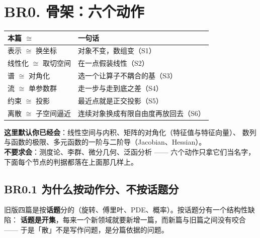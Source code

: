 
\section{BR0. 骨架：六个动作}
\label{sec:br0}

\begin{center}
\small
\begin{tabular}{L{2.4cm}L{11.4cm}}
\toprule
\textbf{本篇 $\cong$} & \textbf{一句话} \\
\midrule
表示 $\cong$ 换坐标 & 对象不变，数组变（S1）\\
线性化 $\cong$ 取切空间 & 在一点假装线性（S2）\\
谱 $\cong$ 对角化 & 选一个让算子不耦合的基（S3）\\
流 $\cong$ 单参数群 & 走一步与走到底之差（S4）\\
约束 $\cong$ 投影 & 最近点就是正交投影（S5）\\
离散 $\cong$ 子空间逼近 & 连续对象换成有限自由度再放回去（S6）\\
\bottomrule
\end{tabular}
\end{center}

\noindent\small\textbf{这里默认你已经会}：线性空间与内积、矩阵的对角化（特征值与特征向量）、
数列与函数的极限、多元函数的一阶与二阶导（Jacobian、Hessian）。\\
\textbf{不要求会}：测度论、李群、微分几何、泛函分析 —— 六个动作只拿它们当名字，
下面每个节点的判据都落在上面那几样上。\normalsize
\smallskip

\subsection{BR0.1 为什么按动作分、不按话题分}

旧版四篇是按\textbf{话题}分的（旋转、傅里叶、PDE、概率）。按话题分有一个结构性缺陷：
\textbf{话题是开集}，每来一个新领域就要新增一篇，而新篇与旧篇之间没有咬合 —— 于是「散」不是写作问题，是分篇依据的问题。

